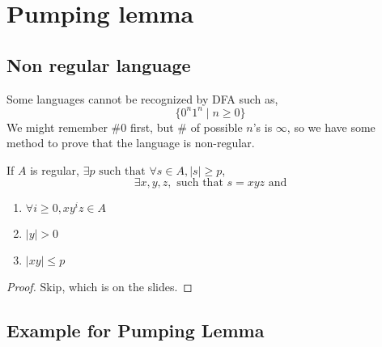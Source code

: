 
\section{Pumping lemma}

\subsection{Non regular language}
Some languages cannot be recognized by DFA such as,
\[
    \{0^n 1^n \mid n \geq 0\}
\]
We might remember \#0 first, but \# of possible $n$'s is  $\infty$, so we have some method to prove that the language is non-regular.

\begin{theorem}
    If $A$ is regular, $\exists p \text{ such that } \forall s \in A, |s| \geq p$,
    \[
        \exists x, y, z, \text{ such that } s = xyz \text{ and}
    \]
    \begin{enumerate}[label=$\arabic*^\circ$]
        \item $\forall i \geq 0, xy^iz \in A$
        \item $|y| > 0$
        \item $|xy| \leq p$
    \end{enumerate}
\end{theorem}
\begin{proof}
Skip, which is on the slides.
\end{proof}

\newpage

\subsection{Example for Pumping Lemma}

